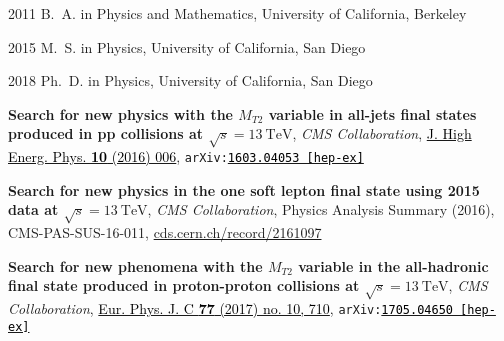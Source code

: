 \begin{frontmatter}
\begin{acknowledgements}
\end{acknowledgements}                                                         

\begin{vitapage}                                                               
\begin{vita}                                                                   
  \item[2011] B.~A. in Physics and Mathematics, University of California, Berkeley                                                    
  \item[2015] M.~S. in Physics, University of California, San Diego                                                    
  \item[2018] Ph.~D. in Physics, University of California, San Diego    
\end{vita}                                                                     
\begin{publications}                                                           
\item \textbf{Search for new physics with the $M_{T2}$ variable in all-jets final states produced in pp collisions at $\sqrt{s}=13~\mathrm{TeV}$}, {\it CMS Collaboration},  \href{http://dx.doi.org/10.1007/JHEP10(2016)006}{\textcolor{black}{J. High Energ. Phys. \textbf{10} (2016) 006}}, {\tt arXiv:\href{http://arxiv.org/abs/1603.04053}{\textcolor{black}{1603.04053 [hep-ex]}}}
\item \textbf{Search for new physics in the one soft lepton final state using 2015 data at $\sqrt{s}=13~\mathrm{TeV}$}, {\it CMS Collaboration}, Physics Analysis Summary (2016), CMS-PAS-SUS-16-011, \textcolor{black}{\href{https://cds.cern.ch/record/2161097}{cds.cern.ch/record/2161097}}
\item \textbf{Search for new phenomena with the $M_{T2}$ variable in the all-hadronic final state produced in proton-proton collisions at $\sqrt{s}=13~\mathrm{TeV}$}, {\it CMS Collaboration}, \href{http://dx.doi.org/10.1140/epjc/s10052-017-5267-x}{\textcolor{black}{Eur. Phys. J. C {\bf77} (2017) no. 10, 710}}, {\tt arXiv:\href{http://arxiv.org/abs/1705.04650}{\textcolor{black}{1705.04650 [hep-ex]}}}

\end{publications}                                                             
\end{vitapage}                                                                 
                                                                               


\end{frontmatter}
